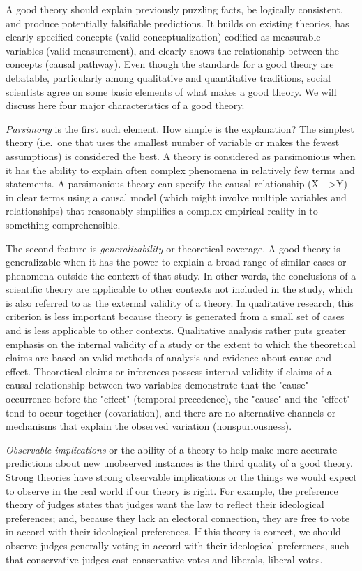 \documentclass{book}
\begin{document}
A good theory should explain previously puzzling facts, be logically
consistent, and produce potentially falsifiable predictions. It builds on
existing theories, has clearly specified concepts (valid conceptualization)
codified as measurable variables (valid measurement), and clearly shows the
relationship between the concepts (causal pathway). Even though the standards
for a good theory are debatable, particularly among qualitative and
quantitative traditions, social scientists agree on some basic elements of
what makes a good theory. We will discuss here four major characteristics of a
good theory.

\emph{Parsimony} is the first such element. How simple is the explanation? The
simplest theory (i.e.~one that uses the smallest number of variable or makes
the fewest assumptions) is considered the best. A theory is considered as
parsimonious when it has the ability to explain often complex phenomena in
relatively few terms and statements. A parsimonious theory can specify the
causal relationship (X---\textgreater Y) in clear terms using a causal model
(which might involve multiple variables and relationships) that reasonably
simplifies a complex empirical reality in to something comprehensible.

The second feature is \emph{generalizability} or theoretical coverage. A good
theory is generalizable when it has the power to explain a broad range of
similar cases or phenomena outside the context of that study. In other words,
the conclusions of a scientific theory are applicable to other contexts not
included in the study, which is also referred to as the external validity of a
theory. In qualitative research, this criterion is less important because
theory is generated from a small set of cases and is less applicable to other
contexts. Qualitative analysis rather puts greater emphasis on the internal
validity of a study or the extent to which the theoretical claims are based on
valid methods of analysis and evidence about cause and effect. Theoretical
claims or inferences possess internal validity if claims of a causal
relationship between two variables demonstrate that the "cause" occurrence
before the "effect" (temporal precedence), the "cause" and the "effect" tend
to occur together (covariation), and there are no alternative channels or
mechanisms that explain the observed variation (nonspuriousness).

\emph{Observable implications} or the ability of a theory to help make more
accurate predictions about new unobserved instances is the third quality of a
good theory. Strong theories have strong observable implications or the things
we would expect to observe in the real world if our theory is right. For
example, the preference theory of judges states that judges want the law to
reflect their ideological preferences; and, because they lack an electoral
connection, they are free to vote in accord with their ideological
preferences. If this theory is correct, we should observe judges generally
voting in accord with their ideological preferences, such that conservative
judges cast conservative votes and liberals, liberal votes.
\end{document}
